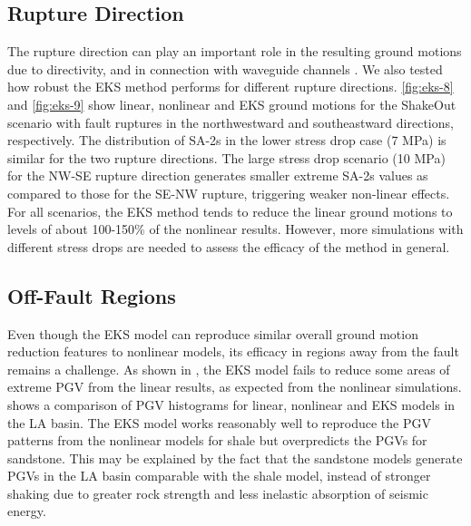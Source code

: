 \subsection{Rupture Direction}
The rupture direction can play an important role in the resulting ground motions due to directivity, and in connection with waveguide channels . We also tested how robust the EKS method performs for different rupture directions. \cref{fig:eks-8} and \ref{fig:eks-9} show linear, nonlinear and EKS ground motions for the ShakeOut scenario with fault ruptures in the  northwestward and southeastward directions, respectively. The distribution of SA-2s in the lower stress drop case (7 MPa) is similar for the two rupture directions. The large stress drop scenario (10 MPa) for the NW-SE rupture direction generates smaller extreme SA-2s values as compared to those for the SE-NW rupture, triggering weaker non-linear effects. For all scenarios, the EKS method tends to reduce the linear ground motions to levels of about 100-150\% of the nonlinear results. However, more simulations with different stress drops are needed to assess the efficacy of the method in general.

\subsection{Off-Fault Regions}

Even though the EKS model can reproduce similar overall ground motion reduction features to nonlinear models, its efficacy in regions away from the fault remains a challenge. As shown in , the EKS model fails to reduce some areas of extreme PGV from the linear results, as expected from the nonlinear simulations.  shows a comparison of PGV histograms for linear, nonlinear and EKS models in the LA basin. The EKS model works reasonably well to reproduce the PGV patterns from the nonlinear models for shale but overpredicts the PGVs for sandstone. This may be explained by the fact that the sandstone models generate PGVs in the LA basin comparable with the shale model, instead of stronger shaking due to greater rock strength and less inelastic absorption of seismic energy.


